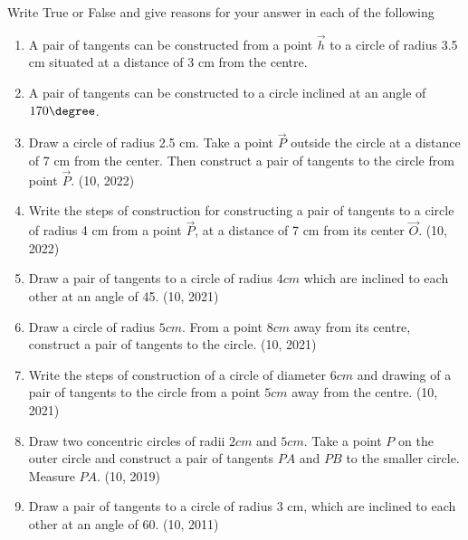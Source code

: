 Write True or False and give reasons for your answer in each of the following 
\begin{enumerate}[resume*]
\item A pair of tangents can be constructed from a point $\vec{h}$ to a circle of radius 3.5 cm situated at a distance of 3 cm from the centre.
\item A pair of tangents can be constructed to a circle inclined at an angle of $170\degree$.
	\item Draw a circle of radius 2.5 cm. Take a point $\vec{P}$ outside the circle at a distance of 7 cm from the center. Then construct a pair of tangents to the circle from point $\vec{P}$.
\hfill (10, 2022)

	\item Write the steps of construction for constructing a pair of tangents to a circle of radius 4 cm from a point $\vec{P}$, at a distance of 7 cm from its center $\vec{O}$.
\hfill (10, 2022)
	\item Draw a pair of tangents to a circle of radius $4 cm$ which are inclined to each other at an angle of 45\degree.	
\hfill (10, 2021)
	\item Draw a circle of radius $5 cm$. From a point $8 cm$ away from its centre, construct a pair of tangents to the circle.
\hfill (10, 2021)
	\item Write the steps of construction of a circle of diameter $6 cm$ and drawing of a pair of tangents to the circle from a point $5 cm$ away from the centre.
\hfill (10, 2021)
\item Draw two concentric circles of radii $2 cm$ and $5 cm$. Take a point $P$ on the outer circle and construct a pair of tangents $PA$ and $PB$ to the smaller circle. Measure $PA$.  
\hfill (10, 2019)
    \item Draw a pair of tangents to a circle of radius $3$ cm, which are inclined to each other at an angle of 60\degree.
\hfill (10, 2011)
\end{enumerate}
